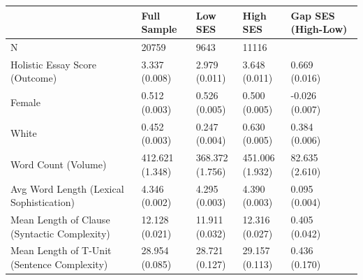 \begin{tabular}{lllll}
\toprule
 & Full Sample & Low SES & High SES & Gap SES (High-Low) \\
\midrule
N & 20759 & 9643 & 11116 &  \\
Holistic Essay Score (Outcome) & \shortstack{3.337 \\ (0.008)} & \shortstack{2.979 \\ (0.011)} & \shortstack{3.648 \\ (0.011)} & \shortstack{0.669 \\ (0.016)} \\
Female & \shortstack{0.512 \\ (0.003)} & \shortstack{0.526 \\ (0.005)} & \shortstack{0.500 \\ (0.005)} & \shortstack{-0.026 \\ (0.007)} \\
White & \shortstack{0.452 \\ (0.003)} & \shortstack{0.247 \\ (0.004)} & \shortstack{0.630 \\ (0.005)} & \shortstack{0.384 \\ (0.006)} \\
Word Count (Volume) & \shortstack{412.621 \\ (1.348)} & \shortstack{368.372 \\ (1.756)} & \shortstack{451.006 \\ (1.932)} & \shortstack{82.635 \\ (2.610)} \\
Avg Word Length (Lexical Sophistication) & \shortstack{4.346 \\ (0.002)} & \shortstack{4.295 \\ (0.003)} & \shortstack{4.390 \\ (0.003)} & \shortstack{0.095 \\ (0.004)} \\
Mean Length of Clause (Syntactic Complexity) & \shortstack{12.128 \\ (0.021)} & \shortstack{11.911 \\ (0.032)} & \shortstack{12.316 \\ (0.027)} & \shortstack{0.405 \\ (0.042)} \\
Mean Length of T-Unit (Sentence Complexity) & \shortstack{28.954 \\ (0.085)} & \shortstack{28.721 \\ (0.127)} & \shortstack{29.157 \\ (0.113)} & \shortstack{0.436 \\ (0.170)} \\

\end{tabular}
